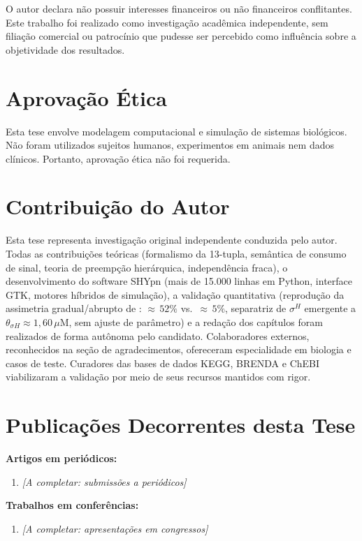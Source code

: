 O autor declara não possuir interesses financeiros ou não financeiros
conflitantes. Este trabalho foi realizado como investigação acadêmica
independente, sem filiação comercial ou patrocínio que pudesse ser percebido
como influência sobre a objetividade dos resultados.

\section*{Aprovação Ética}

Esta tese envolve modelagem computacional e simulação de sistemas biológicos.
Não foram utilizados sujeitos humanos, experimentos em animais nem dados
clínicos. Portanto, aprovação ética não foi requerida.

\section*{Contribuição do Autor}

Esta tese representa investigação original independente conduzida pelo autor.
Todas as contribuições teóricas (formalismo da 13-tupla, semântica de consumo de
sinal, teoria de preempção hierárquica, independência fraca), o desenvolvimento
do software SHYpn (mais de 15.000 linhas em Python, interface GTK, motores
híbridos de simulação), a validação quantitativa (reprodução da assimetria gradual/abrupto de
\textcite{Fujita2005}: ${\approx}\,52\%$ vs.\ ${\approx}\,5\%$, separatriz
de $\sigma^H$ emergente a $\theta_{\sigma H} \approx 1{,}60\,\mu$M, sem
ajuste de parâmetro) e a redação dos capítulos foram realizados de forma
autônoma pelo candidato.
Colaboradores externos, reconhecidos na seção de agradecimentos, ofereceram
especialidade em biologia e casos de teste. Curadores das bases de dados KEGG,
BRENDA e ChEBI viabilizaram a validação por meio de seus recursos mantidos com
rigor.

\section*{Publicações Decorrentes desta Tese}

\textbf{Artigos em periódicos:}
\begin{enumerate}
    \item \textit{[A completar: submissões a periódicos]}
\end{enumerate}

\textbf{Trabalhos em conferências:}
\begin{enumerate}
    \item \textit{[A completar: apresentações em congressos]}
\end{enumerate}

